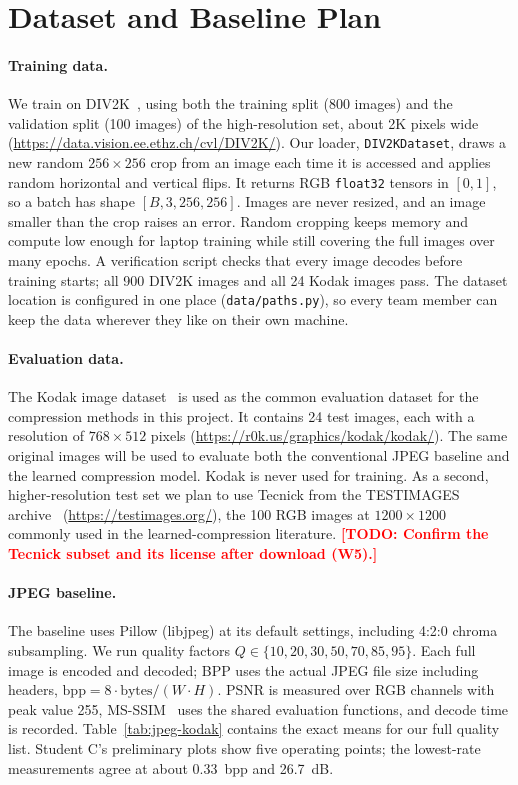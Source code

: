 \documentclass[11pt]{article}
\newcommand{\todo}[1]{\textcolor{red}{\textbf{[TODO: #1]}}}
\begin{document}
\section{Dataset and Baseline Plan}

\paragraph{Training data.} We train on DIV2K~\citep{agustsson2017div2k}, using both
the training split (800 images) and the validation split (100 images) of the
high-resolution set, about 2K pixels wide
(\url{https://data.vision.ee.ethz.ch/cvl/DIV2K/}). Our loader,
\texttt{DIV2KDataset}, draws a new random $256\times256$ crop from an image each
time it is accessed and applies random horizontal and vertical flips. It returns
RGB \texttt{float32} tensors in $[0,1]$, so a batch has shape $[B,3,256,256]$.
Images are never resized, and an image smaller than the crop raises an error.
Random cropping keeps memory and compute low enough for laptop training while
still covering the full images over many epochs. A verification script checks
that every image decodes before training starts; all 900 DIV2K images and all 24
Kodak images pass. The dataset location is configured in one place
(\texttt{data/paths.py}), so every team member can keep the data wherever they
like on their own machine.

\paragraph{Evaluation data.} The Kodak image dataset~\citep{kodak} is used as the
common evaluation dataset for the compression methods in this project. It
contains 24 test images, each with a resolution of $768\times512$ pixels
(\url{https://r0k.us/graphics/kodak/kodak/}). The same original images will be
used to evaluate both the conventional JPEG baseline and the learned compression
model. Kodak is never used for training. As a second, higher-resolution test set
we plan to use Tecnick from the TESTIMAGES archive~\citep{asuni2014testimages}
(\url{https://testimages.org/}), the 100 RGB images at $1200\times1200$ commonly
used in the learned-compression literature. \todo{Confirm the Tecnick subset and
its license after download (W5).}

\paragraph{JPEG baseline.} The baseline uses Pillow (libjpeg) at its default
settings, including 4:2:0 chroma subsampling. We run quality factors
$Q\in\{10,20,30,50,70,85,95\}$. Each full image is encoded and decoded; BPP uses
the actual JPEG file size including headers,
$\text{bpp}=8\cdot\text{bytes}/(W\cdot H)$. PSNR is measured over RGB channels
with peak value 255, MS-SSIM~\citep{wang2003msssim} uses the shared evaluation
functions, and decode time is recorded. Table~\ref{tab:jpeg-kodak}
contains the exact means for our full quality list. Student C's preliminary plots
show five operating points; the lowest-rate measurements agree at about
0.33~bpp and 26.7~dB.
\end{document}
